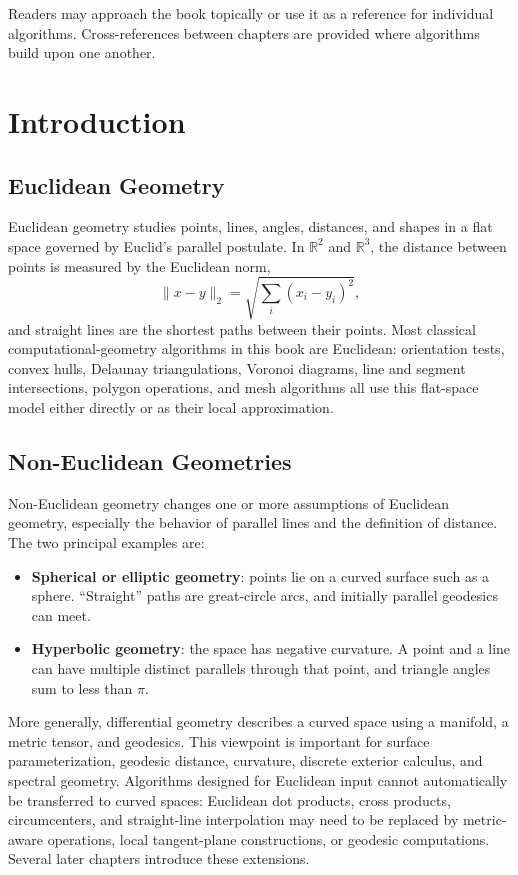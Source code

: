Readers may approach the book topically or use it as a reference for individual algorithms. Cross-references between chapters are provided where algorithms build upon one another.

\chapter*{Introduction}

\section*{Euclidean Geometry}

Euclidean geometry studies points, lines, angles, distances, and shapes in a
flat space governed by Euclid's parallel postulate. In $\mathbb{R}^2$ and $\mathbb{R}^3$,
the distance between points is measured by the Euclidean norm,
\[
  \|x-y\|_2 = \sqrt{\sum_i (x_i-y_i)^2},
\]
and straight lines are the shortest paths between their points. Most
classical computational-geometry algorithms in this book are Euclidean:
orientation tests, convex hulls, Delaunay triangulations, Voronoi diagrams,
line and segment intersections, polygon operations, and mesh algorithms all
use this flat-space model either directly or as their local approximation.

\section*{Non-Euclidean Geometries}

Non-Euclidean geometry changes one or more assumptions of Euclidean geometry,
especially the behavior of parallel lines and the definition of distance.
The two principal examples are:

\begin{itemize}
  \item \textbf{Spherical or elliptic geometry}: points lie on a curved
  surface such as a sphere. ``Straight'' paths are great-circle arcs, and
  initially parallel geodesics can meet.
  \item \textbf{Hyperbolic geometry}: the space has negative curvature. A
  point and a line can have multiple distinct parallels through that point,
  and triangle angles sum to less than $\pi$.
\end{itemize}

More generally, differential geometry describes a curved space using a
manifold, a metric tensor, and geodesics. This viewpoint is important for
surface parameterization, geodesic distance, curvature, discrete exterior
calculus, and spectral geometry. Algorithms designed for Euclidean input
cannot automatically be transferred to curved spaces: Euclidean dot products,
cross products, circumcenters, and straight-line interpolation may need to be
replaced by metric-aware operations, local tangent-plane constructions, or
geodesic computations. Several later chapters introduce these extensions.

